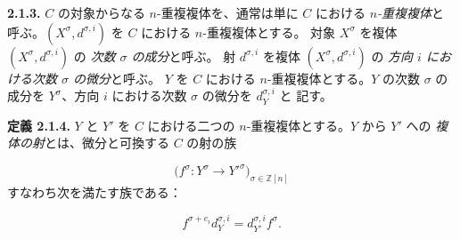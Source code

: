 \noindent\textbf{2.1.3.}\quad
$C$ の対象からなる $n$-重複複体を、通常は単に $C$ における
\emph{$n$-重複複体}と呼ぶ。$(X^\sigma,d^{\sigma,i})$ を $C$ における
$n$-重複複体とする。
対象 $X^\sigma$ を複体 $(X^\sigma,d^{\sigma,i})$ の
\emph{次数 $\sigma$ の成分}と呼ぶ。
射 $d^{\sigma,i}$ を複体 $(X^\sigma,d^{\sigma,i})$ の
\emph{方向 $i$ における次数 $\sigma$ の微分}と呼ぶ。
$Y$ を $C$ における $n$-重複複体とする。$Y$ の次数 $\sigma$ の成分を
$Y^\sigma$、方向 $i$ における次数 $\sigma$ の微分を $d_Y^{\sigma,i}$ と
記す。

\noindent\textbf{定義 2.1.4.}\quad
$Y$ と $Y'$ を $C$ における二つの $n$-重複複体とする。$Y$ から $Y'$ への
\emph{複体の射}とは、微分と可換する $C$ の射の族

\begin{equation*}
  \bigl(f^\sigma\colon Y^\sigma\longrightarrow Y'^{\sigma}\bigr)_{
    \sigma\in\mathbb Z[n]}
\end{equation*}
すなわち次を満たす族である：

\begin{equation}
  f^{\sigma+e_i}d_Y^{\sigma,i}
  =d_{Y'}^{\sigma,i}f^\sigma.
  \tag{2.1.4.1}
\end{equation}
